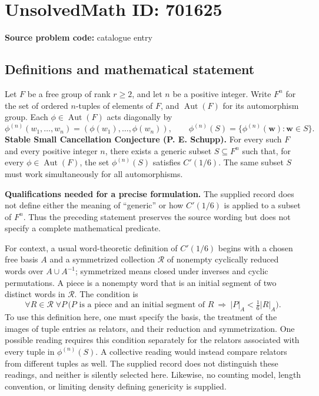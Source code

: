 \documentclass[11pt]{article}
\begin{document}
\section*{UnsolvedMath ID: 701625}
\textbf{Source problem code:} catalogue entry
\subsection{Definitions and mathematical statement}
Let \(F\) be a free group of rank \(r\geq 2\), and let \(n\) be a positive integer. Write \(F^n\) for the set of ordered \(n\)-tuples of elements of \(F\), and \(\operatorname{Aut}(F)\) for its automorphism group. Each \(\phi\in\operatorname{Aut}(F)\) acts diagonally by
\[
\phi^{(n)}(w_1,\ldots,w_n)=(\phi(w_1),\ldots,\phi(w_n)),
\qquad
\phi^{(n)}(S)=\{\phi^{(n)}(\mathbf w):\mathbf w\in S\}.
\]
\textbf{Stable Small Cancellation Conjecture (P. E. Schupp).} For every such \(F\) and every positive integer \(n\), there exists a generic subset \(S\subseteq F^n\) such that, for every \(\phi\in\operatorname{Aut}(F)\), the set \(\phi^{(n)}(S)\) satisfies \(C'(1/6)\). The same subset \(S\) must work simultaneously for all automorphisms.

\textbf{Qualifications needed for a precise formulation.} The supplied record does not define either the meaning of ``generic'' or how \(C'(1/6)\) is applied to a subset of \(F^n\). Thus the preceding statement preserves the source wording but does not specify a complete mathematical predicate.

For context, a usual word-theoretic definition of \(C'(1/6)\) begins with a chosen free basis \(A\) and a symmetrized collection \(\mathcal R\) of nonempty cyclically reduced words over \(A\cup A^{-1}\); symmetrized means closed under inverses and cyclic permutations. A piece is a nonempty word that is an initial segment of two distinct words in \(\mathcal R\). The condition is
\[
\forall R\in\mathcal R\;\forall P\,
\bigl(P\text{ is a piece and an initial segment of }R
\ \Longrightarrow\ |P|_A<\tfrac16|R|_A\bigr).
\]
To use this definition here, one must specify the basis, the treatment of the images of tuple entries as relators, and their reduction and symmetrization. One possible reading requires this condition separately for the relators associated with every tuple in \(\phi^{(n)}(S)\). A collective reading would instead compare relators from different tuples as well. The supplied record does not distinguish these readings, and neither is silently selected here. Likewise, no counting model, length convention, or limiting density defining genericity is supplied.
\end{document}
